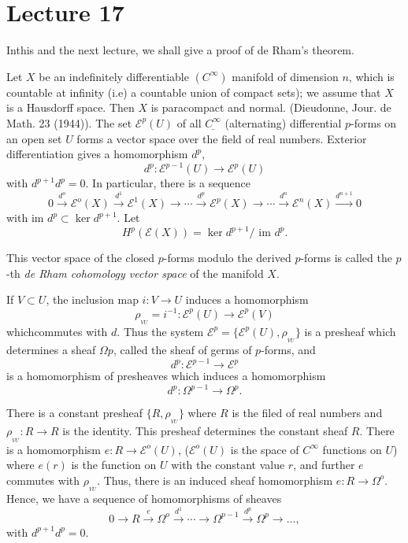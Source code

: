 \chapter{Lecture 17}%

In\pageoriginale this and the next lecture, we shall give a proof of
de Rham's theorem.  

Let $X$ be an indefinitely differentiable $(C^\infty)$ manifold of
dimension $n$, which is countable at infinity (i.e) a countable union
of compact sets); we assume that $X$ is a Hausdorff space. Then $X$ is
paracompact and normal. (Dieudonne, Jour. de Math. 23 (1944)). The set
$\mathscr{E}^p (U)$ of all $\underline{C^\infty}$ (alternating)
differential $p$-forms on an open set $U$ forms a vector space over the
field of real numbers. Exterior differentiation gives a homomorphism
$d^p$,    
$$
d^p : \mathscr{E}^{p-1} (U) \to \mathscr{E}^p (U)  
$$
with $d^{p+1} d^p = 0$. In particular, there is a sequence 
$$
0 \xrightarrow{d^o} \mathscr{E}^o (X)  \xrightarrow{d^1}
\mathscr{E}^1(X) \to \cdots \xrightarrow{d^p}  \mathscr{E}^p (X) \to
\cdots \xrightarrow{d^n}  \mathscr{E}^n (X)  \xrightarrow{d^{n+1}} 0 
$$
with  im $ d^p \subset \ker d^{p+1}$. Let 
$$
H^p ( \mathscr{E}(X)) = \ker d^{p+1} / \text{ im } d^p. 
$$

This vector space of the closed $p$-forms modulo the derived $p$-forms is
called the $p$-th \textit{de Rham cohomology vector space} of the
manifold $X$. 

If $V\subset U$, the inclusion map $i : V \to U$ induces a
homomorphism 
$$
\rho_{_{VU}} = i^{-1} :  \mathscr{E}^p (U) \to  \mathscr{E}^p (V)
$$
which\pageoriginale commutes with $d$. Thus the system $ \mathscr{E}^p = \{
\mathscr{E}^p (U), \rho_{_{VU}} \}$ is a presheaf which determines a
sheaf $\Omega p$, called the sheaf of germs of $p$-forms, and  
$$
d^p :  \mathscr{E}^{p-1} \to  \mathscr{E}^p
$$
is a homomorphism of presheaves which induces a homomorphism 
$$
d^p : \Omega^{p-1} \longrightarrow \Omega^p.
$$

There is a constant presheaf $\{ R, \rho_{_{VU}}\}$ where $R$ is the 
filed of real numbers and $\rho_{_{VU}} : R \to R$ is the identity. This
presheaf determines the constant sheaf $R$. There is a homomorphism $e
: R \to  \mathscr{E}^o (U)$, ($\mathscr{E}^o(U)$ is the space of
$C^\infty$ functions on $U$) where $e(r)$ is the function on $U$ with
the constant value $r$, and further $e$ commutes with
$\rho_{_{VU}}$. Thus, there is an induced sheaf homomorphism $e : R \to
\Omega^o$. Hence, we have a sequence of homomorphisms of sheaves  
$$
0 \to R \xrightarrow{e} \Omega^o \xrightarrow{d^1} \cdots \to 
\Omega^{p-1} \xrightarrow{d^p} \Omega^p \to \ldots, 
$$
with $d^{p+1} d^p=0$.

